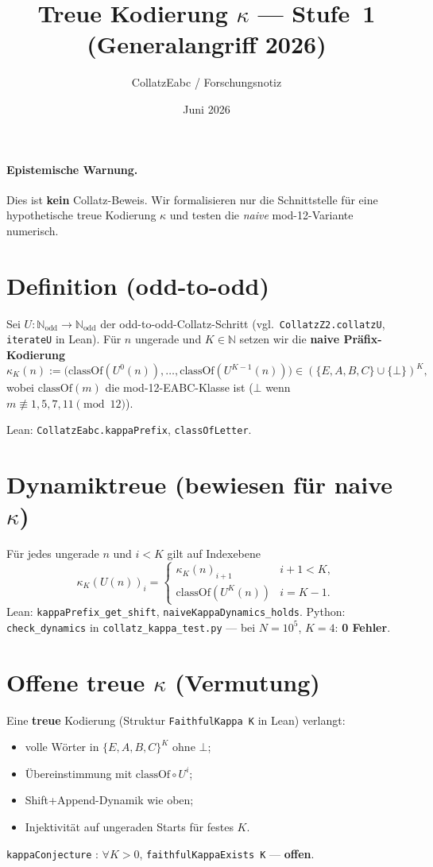 \documentclass[11pt,a4paper]{article}
\title{Treue Kodierung $\kappa$ --- Stufe~1 (Generalangriff 2026)}
\author{CollatzEabc / Forschungsnotiz}
\date{Juni 2026}
\begin{document}
\maketitle

\paragraph{Epistemische Warnung.}
Dies ist \textbf{kein} Collatz-Beweis. Wir formalisieren nur die Schnittstelle
für eine hypothetische treue Kodierung $\kappa$ und testen die \emph{naive}
mod-12-Variante numerisch.

\section{Definition (odd-to-odd)}

Sei $U:\mathbb{N}_{\mathrm{odd}}\to\mathbb{N}_{\mathrm{odd}}$ der odd-to-odd-Collatz-Schritt
(vgl.\ \texttt{CollatzZ2.collatzU}, \texttt{iterateU} in Lean).
Für $n$ ungerade und $K\in\mathbb{N}$ setzen wir die \textbf{naive Präfix-Kodierung}
\[
  \kappa_K(n) := \bigl(\mathrm{classOf}(U^0(n)),\ldots,\mathrm{classOf}(U^{K-1}(n))\bigr)
  \in (\{E,A,B,C\}\cup\{\bot\})^K,
\]
wobei $\mathrm{classOf}(m)$ die mod-12-EABC-Klasse ist ($\bot$ wenn $m\not\equiv 1,5,7,11\pmod{12}$).

Lean: \texttt{CollatzEabc.kappaPrefix}, \texttt{classOfLetter}.

\section{Dynamiktreue (bewiesen für naive $\kappa$)}

Für jedes ungerade $n$ und $i<K$ gilt auf Indexebene
\[
  \kappa_K(U(n))_i =
  \begin{cases}
    \kappa_K(n)_{i+1} & i+1<K,\\
    \mathrm{classOf}(U^K(n)) & i=K-1.
  \end{cases}
\]
Lean: \texttt{kappaPrefix\_get\_shift}, \texttt{naiveKappaDynamics\_holds}.
Python: \texttt{check\_dynamics} in \texttt{collatz\_kappa\_test.py} --- bei $N=10^5$, $K=4$: \textbf{0 Fehler}.

\section{Offene treue $\kappa$ (Vermutung)}

Eine \textbf{treue} Kodierung (Struktur \texttt{FaithfulKappa K} in Lean) verlangt:
\begin{itemize}
  \item volle Wörter in $\{E,A,B,C\}^K$ ohne $\bot$;
  \item Übereinstimmung mit $\mathrm{classOf}\circ U^i$;
  \item Shift+Append-Dynamik wie oben;
  \item Injektivität auf ungeraden Starts für festes $K$.
\end{itemize}
\texttt{kappaConjecture} : $\forall K>0$, \texttt{faithfulKappaExists K} --- \textbf{offen}.
\end{document}
